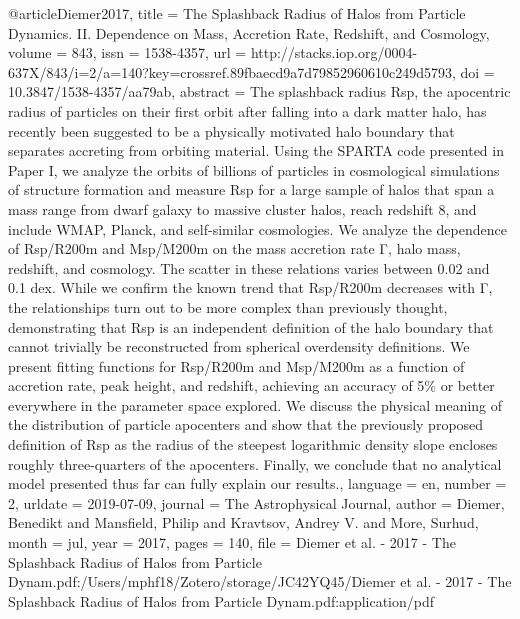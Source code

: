 {@article{Diemer2017,
	title = {The {Splashback} {Radius} of {Halos} from {Particle} {Dynamics}. {II}. {Dependence} on {Mass}, {Accretion} {Rate}, {Redshift}, and {Cosmology}},
	volume = {843},
	issn = {1538-4357},
	url = {http://stacks.iop.org/0004-637X/843/i=2/a=140?key=crossref.89fbaecd9a7d79852960610c249d5793},
	doi = {10.3847/1538-4357/aa79ab},
	abstract = {The splashback radius Rsp, the apocentric radius of particles on their ﬁrst orbit after falling into a dark matter halo, has recently been suggested to be a physically motivated halo boundary that separates accreting from orbiting material. Using the SPARTA code presented in Paper I, we analyze the orbits of billions of particles in cosmological simulations of structure formation and measure Rsp for a large sample of halos that span a mass range from dwarf galaxy to massive cluster halos, reach redshift 8, and include WMAP, Planck, and self-similar cosmologies. We analyze the dependence of Rsp/R200m and Msp/M200m on the mass accretion rate Γ, halo mass, redshift, and cosmology. The scatter in these relations varies between 0.02 and 0.1 dex. While we conﬁrm the known trend that Rsp/R200m decreases with Γ, the relationships turn out to be more complex than previously thought, demonstrating that Rsp is an independent deﬁnition of the halo boundary that cannot trivially be reconstructed from spherical overdensity deﬁnitions. We present ﬁtting functions for Rsp/R200m and Msp/M200m as a function of accretion rate, peak height, and redshift, achieving an accuracy of 5\% or better everywhere in the parameter space explored. We discuss the physical meaning of the distribution of particle apocenters and show that the previously proposed deﬁnition of Rsp as the radius of the steepest logarithmic density slope encloses roughly three-quarters of the apocenters. Finally, we conclude that no analytical model presented thus far can fully explain our results.},
	language = {en},
	number = {2},
	urldate = {2019-07-09},
	journal = {The Astrophysical Journal},
	author = {Diemer, Benedikt and Mansfield, Philip and Kravtsov, Andrey V. and More, Surhud},
	month = jul,
	year = {2017},
	pages = {140},
	file = {Diemer et al. - 2017 - The Splashback Radius of Halos from Particle Dynam.pdf:/Users/mphf18/Zotero/storage/JC42YQ45/Diemer et al. - 2017 - The Splashback Radius of Halos from Particle Dynam.pdf:application/pdf}
}

}
